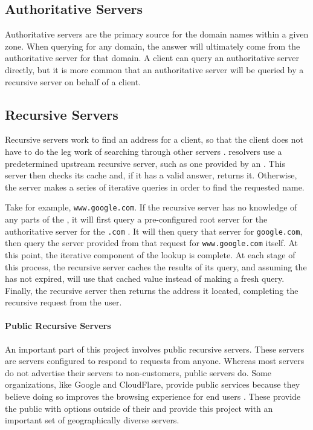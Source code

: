 \subsection{Authoritative Servers}
Authoritative servers are the primary source for the domain names within a given zone. When querying for any domain, the answer will ultimately come from the authoritative server for that domain. A \dns client can query an authoritative server directly, but it is more common that an authoritative server will be queried by a recursive server on behalf of a \dns client.

\subsection{Recursive Servers}
Recursive \dns servers work to find an \ip address for a client, so that the client does not have to do the leg work of searching through other \dns servers \cite{Cloudflarea}. \DNS resolvers use a predetermined upstream recursive \dns server, such as one provided by an \isp \cite{Oracle2010RecursiveWork}. This server then checks its cache and, if it has a valid answer, returns it. Otherwise, the server makes a series of iterative queries in order to find the requested name. 

Take for example, \texttt{www.google.com}. If the recursive server has no knowledge of any parts of the \acUrl, it will first query a pre-configured root \dns server for the authoritative server for the \texttt{.com} \tld. It will then query that server for \texttt{google.com}, then query the server provided from that request for \texttt{www.google.com} itself. At this point, the iterative component of the lookup is complete. At each stage of this process, the recursive server caches the results of its query, and assuming the \ttl has not expired, will use that cached value instead of making a fresh query. Finally, the recursive server then returns the \ip address it located, completing the recursive request from the user.

\paragraph{Public Recursive \dns Servers}
An important part of this project involves public recursive \dns servers. These servers are \dns servers configured to respond to requests from anyone. Whereas most \isp servers do not advertise their \dns servers to non-customers, public servers do. Some organizations, like Google and CloudFlare, provide public \dns services because they believe doing so improves the browsing experience for end users \cite{GoogleIntroductionDNS}. These provide the public with \dns options outside of their \isp and provide this project with an important set of geographically diverse servers.
